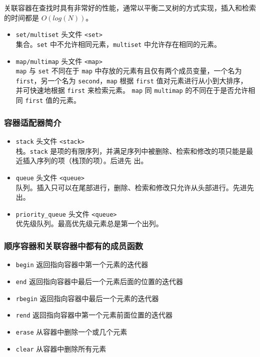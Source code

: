 \documentclass[UTF8]{ctexart}
\begin{document}
关联容器在查找时具有非常好的性能，通常以平衡二叉树的方式实现，插入和检索的时间都是 $O(log(N))$。

\begin{itemize}
    \item \texttt{set/multiset} 头文件 \texttt{<set>} \\
    集合。\texttt{set} 中不允许相同元素，\texttt{multiset} 中允许存在相同的元素。
    \item \texttt{map/multimap} 头文件 \texttt{<map>} \\
    \texttt{map} 与 \texttt{set} 不同在于 \texttt{map} 中存放的元素有且仅有两个成员变量，一个名为
    \texttt{first}，另一个名为 \texttt{second}，\texttt{map} 根据 \texttt{first} 值对元素进行从小到大排序，
    并可快速地根据 \texttt{first} 来检索元素。
    \texttt{map} 同 \texttt{multimap} 的不同在于是否允许相同 \texttt{first} 值的元素。
\end{itemize}

\subsubsection{容器适配器简介}
\begin{itemize}
    \item \texttt{stack} 头文件 \texttt{<stack>} \\
    栈。\texttt{stack} 是项的有限序列，并满足序列中被删除、检索和修改的项只能是最近插入序列的项（栈顶的项）。后进先
    出。
    \item \texttt{queue} 头文件 \texttt{<queue>} \\
    队列。插入只可以在尾部进行，删除、检索和修改只允许从头部进行。先进先出。
    \item \texttt{priority\_queue} 头文件 \texttt{<queue>} \\
    优先级队列。最高优先级元素总是第一个出列。
\end{itemize}

\subsubsection{顺序容器和关联容器中都有的成员函数}
\begin{itemize}
    \item \texttt{begin} 返回指向容器中第一个元素的迭代器
    \item \texttt{end} 返回指向容器中最后一个元素后面的位置的迭代器
    \item \texttt{rbegin} 返回指向容器中最后一个元素的迭代器
    \item \texttt{rend} 返回指向容器中第一个元素前面位置的迭代器
    \item \texttt{erase} 从容器中删除一个或几个元素
    \item \texttt{clear} 从容器中删除所有元素
\end{itemize}
\end{document}
